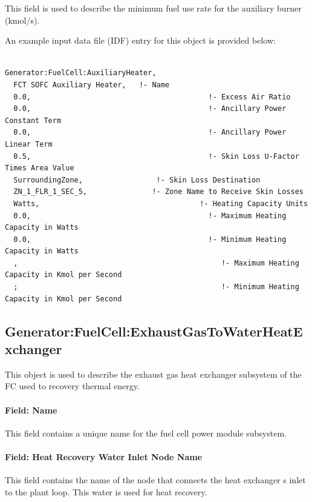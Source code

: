 This field is used to describe the minimum fuel use rate for the auxiliary burner (kmol/s).

An example input data file (IDF) entry for this object is provided below:

\begin{lstlisting}

Generator:FuelCell:AuxiliaryHeater,
  FCT SOFC Auxiliary Heater,   !- Name
  0.0,                                         !- Excess Air Ratio
  0.0,                                         !- Ancillary Power Constant Term
  0.0,                                         !- Ancillary Power Linear Term
  0.5,                                         !- Skin Loss U-Factor Times Area Value
  SurroundingZone,                 !- Skin Loss Destination
  ZN_1_FLR_1_SEC_5,               !- Zone Name to Receive Skin Losses
  Watts,                                     !- Heating Capacity Units
  0.0,                                         !- Maximum Heating Capacity in Watts
  0.0,                                         !- Minimum Heating Capacity in Watts
  ,                                               !- Maximum Heating Capacity in Kmol per Second
  ;                                               !- Minimum Heating Capacity in Kmol per Second
\end{lstlisting}

\subsection{Generator:FuelCell:ExhaustGasToWaterHeatExchanger}

This object is used to describe the exhaust gas heat exchanger subsystem of the FC used to recovery thermal energy.

\paragraph{Field: Name}\label{field-name-19-000}

This field contains a unique name for the fuel cell power module subsystem.

\paragraph{Field: Heat Recovery Water Inlet Node Name}\label{field-heat-recovery-water-inlet-node-name-2}

This field contains the name of the node that connects the heat exchanger s inlet to the plant loop. This water is used for heat recovery.

